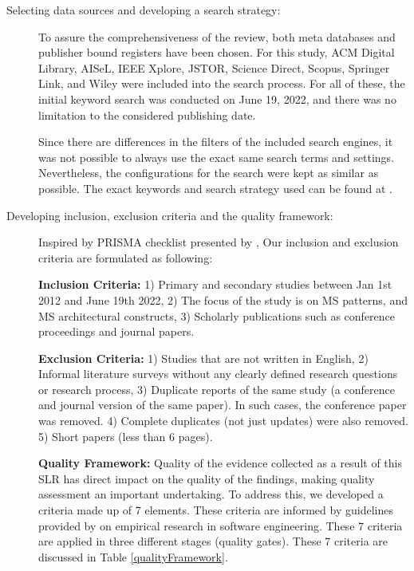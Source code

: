\documentclass[a4paper,11pt,article,oneside]{memoir}
\begin{document}
\begin{description}
    \item[Selecting data sources and developing a search strategy:] To assure the comprehensiveness of the review, both meta databases and publisher bound registers have been chosen. For this study, ACM Digital Library, AISeL, IEEE Xplore, JSTOR, Science Direct, Scopus, Springer Link, and Wiley were included into the search process. For all of these, the initial keyword search was conducted on June 19, 2022, and there was no limitation to the considered publishing date.

    Since there are differences in the filters of the included search engines, it was not possible to always use the exact same search terms and settings. Nevertheless, the configurations for the search were kept as similar as possible. The exact keywords and search strategy used can be found at \citet{SLRsearchTerms}. 

    \item[Developing inclusion, exclusion criteria and the quality framework:] Inspired by PRISMA checklist presented by \citet{tricco2018prisma}, Our inclusion and exclusion criteria are formulated as following:

    \textbf{Inclusion Criteria:} 1) Primary and secondary studies between Jan 1st 2012 and June 19th 2022, 2) The focus of the study is on MS patterns, and MS architectural constructs, 3) Scholarly publications such as conference proceedings and journal papers.
    
    \textbf{Exclusion Criteria:} 1) Studies that are not written in English, 2) Informal literature surveys without any clearly defined research questions or research process, 3) Duplicate reports of the same study (a conference and journal version of the same paper). In such cases, the conference paper was removed. 4) Complete duplicates (not just updates) were also removed. 5) Short papers (less than 6 pages).
    
    \textbf{Quality Framework:} Quality of the evidence collected as a result of this SLR has direct impact on the quality of the findings, making quality assessment an important undertaking. To address this, we developed a criteria made up of 7 elements. These criteria are informed by guidelines provided by \citet{Kitchenham.2004} on empirical research in software engineering. These 7 criteria are applied in three different stages (quality gates). These 7 criteria are discussed in Table \ref{qualityFramework}.


\end{description}
\end{document}
